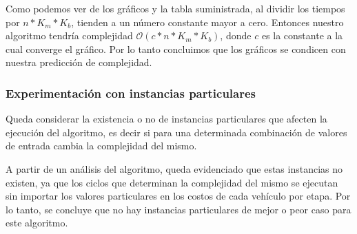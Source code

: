 Como podemos ver de los gráficos y la tabla suministrada, al dividir los tiempos por $n*K_m*K_b$, tienden a un número constante mayor a cero. Entonces nuestro algoritmo tendría complejidad $\mathcal{O}(c*n*K_m*K_b)$, donde $c$ es la constante a la cual converge el gráfico. Por lo tanto concluimos que los gráficos se condicen con nuestra predicción de complejidad.

\subsubsection{Experimentación con instancias particulares}
Queda considerar la existencia o no de instancias particulares que afecten la ejecución del algoritmo, es decir si para una determinada combinación de valores de entrada cambia la complejidad del mismo.

A partir de un análisis del algoritmo, queda evidenciado que estas instancias no existen, ya que los ciclos que determinan la complejidad del mismo se ejecutan sin importar los valores particulares en los costos de cada vehículo por etapa. Por lo tanto, se concluye que no hay instancias particulares de mejor o peor caso para este algoritmo.